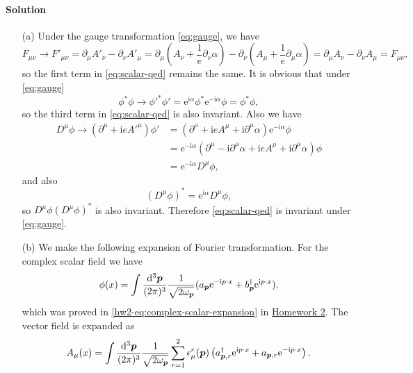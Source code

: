 \documentclass[hyperref, a4paper]{article}
\newcommand*{\ii}{\mathrm{i}}
\newcommand*{\ee}{\mathrm{e}}
\newcommand{\hwtwo}{\href{../2/2.pdf}{Homework 2}}
\begin{document}
\paragraph{Solution} \begin{itemize}
\item[(a)] Under the gauge transformation \eqref{eq:gauge}, we have 
\[
    F_{\mu \nu}  \to 
    F'_{\mu \nu} = \partial_\mu A'_\nu - \partial_\nu A'_\mu
    = \partial_\mu \left(A_\nu + \frac{1}{e} \partial_\nu \alpha\right) 
    - \partial_\nu \left(A_\mu + \frac{1}{e} \partial_\mu \alpha\right)
    = \partial_\mu A_\nu - \partial_\nu A_\mu = F_{\mu \nu},
\] 
so the first term in \eqref{eq:scalar-qed} remains the same. It is obvious that under \eqref{eq:gauge}
\[
    \phi^* \phi \to \phi'^* \phi' = \ee^{\ii \alpha} \phi^* \ee^{- \ii \alpha} \phi = \phi^* \phi,
\]
so the third term in \eqref{eq:scalar-qed} is also invariant. Also we have
\[
    \begin{aligned}
        D^\mu \phi \to (\partial^\mu + \ii e A'^\mu) \phi' 
        &= (\partial^\mu + \ii e A^\mu + \ii \partial^\mu \alpha) \ee^{- \ii \alpha} \phi  \\
        &= \ee^{- \ii \alpha} (\partial^\mu - \ii \partial^\mu \alpha 
        + \ii e A^\mu + \ii \partial^\mu \alpha) \phi \\
        &= \ee^{- \ii \alpha} D^\mu \phi,
    \end{aligned}
\]
and also 
\[
    (D^\mu \phi)^* = \ee^{\ii \alpha} D^\mu \phi, 
\]
so $D^\mu \phi (D^\mu \phi)^*$ is also invariant. 
Therefore \eqref{eq:scalar-qed} is invariant under \eqref{eq:gauge}.

\item[(b)] We make the following expansion of Fourier transformation. For the complex scalar field we have 
\begin{equation}
    \phi(x) = \int \frac{\dd[3]{\vb*{p}}}{(2\pi)^3} \frac{1}{\sqrt{2 \omega_{\vb*{p}}}} (a_{\vb*{p}} \ee^{- \ii p \cdot x} + b^\dagger_{\vb*{p}} \ee^{\ii p \cdot x}).
\end{equation}
which was proved in \eqref{hw2-eq:complex-scalar-expansion} in \hwtwo. The vector field is expanded as 
\begin{equation}
    A_\mu(x) = \int \frac{\dd[3]{\vb*{p}}}{(2\pi)^3} \frac{1}{\sqrt{2 \omega_{\vb*{p}}}} \sum_{r=1}^2 \epsilon_\mu^r(\vb*{p}) \left({a}_{\vb*{p}, r}^\dagger \ee^{ \ii p \cdot x} + {a}_{\vb*{p}, r} \ee^{ - \ii p \cdot x} \right).
\end{equation}


\end{itemize}
\end{document}
